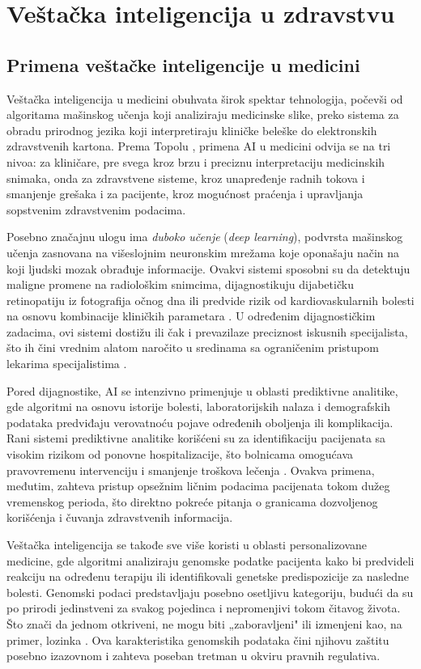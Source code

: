 \documentclass[12pt]{article}
\begin{document}
\section{Veštačka inteligencija u zdravstvu}
 
\subsection{Primena veštačke inteligencije u medicini}
 
Veštačka inteligencija u medicini obuhvata širok spektar tehnologija, počevši od algoritama mašinskog učenja koji analiziraju medicinske slike, preko sistema za obradu prirodnog jezika koji interpretiraju kliničke beleške do elektronskih zdravstvenih kartona. Prema Topolu \cite{topol2019}, primena AI u medicini odvija se na tri nivoa: za kliničare, pre svega kroz brzu i preciznu interpretaciju medicinskih snimaka, onda za zdravstvene sisteme, kroz unapređenje radnih tokova i smanjenje grešaka i za pacijente, kroz 
mogućnost praćenja i upravljanja sopstvenim zdravstvenim podacima.
 
Posebno značajnu ulogu ima \textit{duboko učenje} (\textit{deep learning}), podvrsta mašinskog 
učenja zasnovana na višeslojnim neuronskim mrežama koje oponašaju način na koji ljudski mozak obrađuje informacije. Ovakvi sistemi sposobni su da detektuju maligne promene na radiološkim snimcima, dijagnostikuju dijabetičku retinopatiju iz fotografija očnog dna ili predvide rizik od kardiovaskularnih bolesti na osnovu kombinacije kliničkih parametara \cite{topol2019}. U određenim dijagnostičkim zadacima, ovi sistemi dostižu ili čak i prevazilaze preciznost iskusnih specijalista, što ih čini vrednim alatom naročito u sredinama sa ograničenim pristupom lekarima specijalistima \cite{murdoch2021}.
 
Pored dijagnostike, AI se intenzivno primenjuje u oblasti prediktivne analitike, gde algoritmi na osnovu istorije bolesti, laboratorijskih nalaza i demografskih podataka predviđaju verovatnoću pojave određenih oboljenja ili komplikacija. Rani sistemi prediktivne analitike korišćeni su za identifikaciju pacijenata sa visokim rizikom od ponovne hospitalizacije, što bolnicama omogućava pravovremenu intervenciju i smanjenje troškova lečenja \cite{abouelmehdi2017}. Ovakva primena, međutim, zahteva pristup opsežnim ličnim podacima pacijenata tokom dužeg vremenskog perioda, što direktno pokreće pitanja o granicama dozvoljenog korišćenja i čuvanja zdravstvenih informacija.
 
Veštačka inteligencija se takođe sve više koristi u oblasti personalizovane medicine, gde algoritmi analiziraju genomske podatke pacijenta kako bi predvideli reakciju na određenu terapiju ili identifikovali genetske predispozicije za nasledne bolesti. Genomski podaci predstavljaju posebno osetljivu kategoriju, budući da su po prirodi jedinstveni za svakog pojedinca i nepromenjivi tokom čitavog života. Što znači da jednom otkriveni, ne mogu biti „zaboravljeni" ili izmenjeni kao, na primer, lozinka \cite{murdoch2021}. 
Ova karakteristika genomskih podataka čini njihovu zaštitu posebno izazovnom i zahteva poseban tretman u okviru pravnih regulativa.
\end{document}
